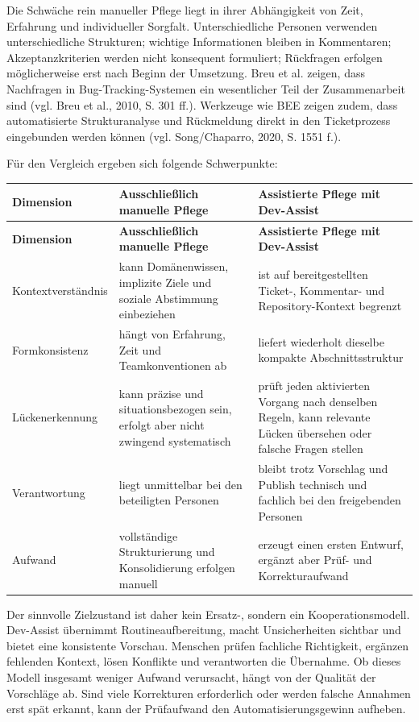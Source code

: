 Die Schwäche rein manueller Pflege liegt in ihrer Abhängigkeit von Zeit, Erfahrung und individueller Sorgfalt. Unterschiedliche Personen verwenden unterschiedliche Strukturen; wichtige Informationen bleiben in Kommentaren; Akzeptanzkriterien werden nicht konsequent formuliert; Rückfragen erfolgen möglicherweise erst nach Beginn der Umsetzung. Breu et al. zeigen, dass Nachfragen in Bug-Tracking-Systemen ein wesentlicher Teil der Zusammenarbeit sind (vgl. Breu et al., 2010, S. 301 ff.). Werkzeuge wie BEE zeigen zudem, dass automatisierte Strukturanalyse und Rückmeldung direkt in den Ticketprozess eingebunden werden können (vgl. Song/Chaparro, 2020, S. 1551 f.).

Für den Vergleich ergeben sich folgende Schwerpunkte:

\begin{longtable}{@{}>{\raggedright\arraybackslash}p{}>{\raggedright\arraybackslash}p{}>{\raggedright\arraybackslash}p{}@{}}
\toprule
\textbf{Dimension} & \textbf{Ausschließlich manuelle Pflege} & \textbf{Assistierte Pflege mit Dev-Assist} \\
\midrule
\endfirsthead
\toprule
\textbf{Dimension} & \textbf{Ausschließlich manuelle Pflege} & \textbf{Assistierte Pflege mit Dev-Assist} \\
\midrule
\endhead
Kontextverständnis & kann Domänenwissen, implizite Ziele und soziale Abstimmung einbeziehen & ist auf bereitgestellten Ticket-, Kommentar- und Repository-Kontext begrenzt \\
Formkonsistenz & hängt von Erfahrung, Zeit und Teamkonventionen ab & liefert wiederholt dieselbe kompakte Abschnittsstruktur \\
Lückenerkennung & kann präzise und situationsbezogen sein, erfolgt aber nicht zwingend systematisch & prüft jeden aktivierten Vorgang nach denselben Regeln, kann relevante Lücken übersehen oder falsche Fragen stellen \\
Verantwortung & liegt unmittelbar bei den beteiligten Personen & bleibt trotz Vorschlag und Publish technisch und fachlich bei den freigebenden Personen \\
Aufwand & vollständige Strukturierung und Konsolidierung erfolgen manuell & erzeugt einen ersten Entwurf, ergänzt aber Prüf- und Korrekturaufwand \\
\bottomrule
\end{longtable}

Der sinnvolle Zielzustand ist daher kein Ersatz-, sondern ein Kooperationsmodell. Dev-Assist übernimmt Routineaufbereitung, macht Unsicherheiten sichtbar und bietet eine konsistente Vorschau. Menschen prüfen fachliche Richtigkeit, ergänzen fehlenden Kontext, lösen Konflikte und verantworten die Übernahme. Ob dieses Modell insgesamt weniger Aufwand verursacht, hängt von der Qualität der Vorschläge ab. Sind viele Korrekturen erforderlich oder werden falsche Annahmen erst spät erkannt, kann der Prüfaufwand den Automatisierungsgewinn aufheben.

